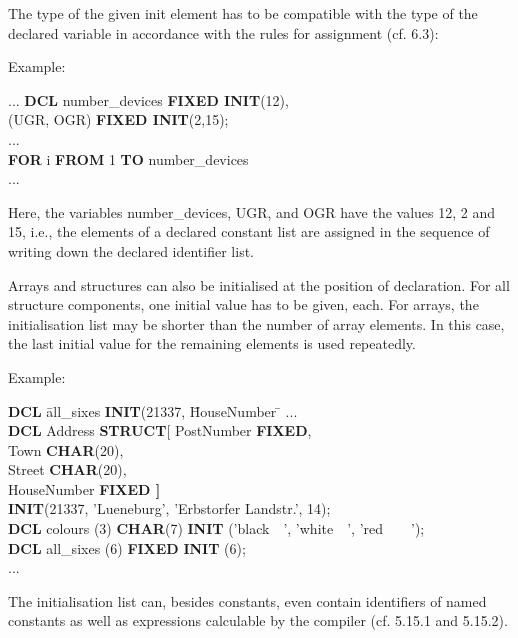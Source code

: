 The type of the given init element has to be compatible with the type of
the declared variable in accordance with the rules for assignment (cf.
6.3):

Example:

...
{\bf DCL} number\_devices {\bf FIXED INIT}(12),\\
\x (UGR, OGR) {\bf FIXED INIT}(2,15);\\
...\\
{\bf FOR} i {\bf FROM} 1 {\bf TO} number\_devices\\
...

Here, the variables number\_devices, UGR, and OGR have the values 12, 2
and 15, i.e., the elements of a declared constant list are assigned in
the sequence of writing down the declared identifier list.

Arrays and structures can also be initialised at the position of
declaration. For all structure components, one initial value has to be
given, each. For arrays, the initialisation list may be shorter than the
number of array elements. In this case, the last initial value for the
remaining elements is used repeatedly.

Example:

\begin{tabbing}
{\bf DCL} \= all\_sixes \= {\bf INIT}(21337, \= HouseNumber \= \kill
... \> \> \> \> \\
{\bf DCL} \> Address \> {\bf STRUCT}[ \> PostNumber  \> {\bf FIXED},\\
          \>         \>               \> Town        \> {\bf CHAR}(20),\\
          \>         \>               \> Street      \> {\bf CHAR}(20),\\
          \>         \>               \> HouseNumber \> {\bf FIXED \hspace{1cm} ]}\\
          \>         \> {\bf INIT}(21337, 'Lueneburg', 'Erbstorfer Landstr.', 14); \> \> \\
{\bf DCL} \> colours \> (3)           \> {\bf CHAR}(7) \> {\bf INIT} ('black\ \ ', 'white\ \ ', 'red\ \ \ \ ');\\
{\bf DCL} \> all\_sixes \> (6)        \> {\bf FIXED}  \> {\bf INIT} (6);\\
... \> \> \> \>
\end{tabbing}

The initialisation list can, besides constants, even contain identifiers
of named constants as well as expressions calculable by the compiler
(cf. 5.15.1 and 5.15.2).

